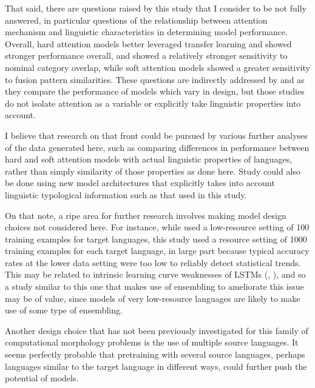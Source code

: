 That said, there are questions raised by this study that I consider to be not fully answered, in particular questions of the relationship between attention mechanism and linguistic characteristics in determining model performance. Overall, hard attention models better leveraged transfer learning and showed stronger performance overall, and showed a relatively stronger sensitivity to nominal category overlap, while soft attention models showed a greater sensitivity to fusion pattern similarities. These questions are indirectly addressed by \cite{Cotterell2018b} and \cite{McCarthy2019} as they compare the performance of models which vary in design, but those studies do not isolate attention as a variable or explicitly take linguistic properties into account.

I believe that research on that front could be pursued by various further analyses of the data generated here, such as comparing differences in performance between hard and soft attention models with actual linguistic properties of languages, rather than simply similarity of those properties as done here. Study could also be done using new model architectures that explicitly takes into account linguistic typological information such as that used in this study.

On that note, a ripe area for further research involves making model design choices not considered here. For instance, while \cite{McCarthy2019} used a low-resource setting of 100 training examples for target languages, this study used a resource setting of 1000 training examples for each target language, in large part because typical accuracy rates at the lower data setting were too low to reliably detect statistical trends. This may be related to intrinsic learning curve weaknesses of LSTMs (\cite{Cotterell2017a}, \cite{Cotterell2018b}), and so a study similar to this one that makes use of ensembling to ameliorate this issue may be of value, since models of very low-resource languages are likely to make use of some type of ensembling.

Another design choice that has not been previously investigated for this family of computational morphology problems is the use of multiple source languages. It seems perfectly probable that pretraining with several source languages, perhaps languages similar to the target language in different ways, could further push the potential of models. 